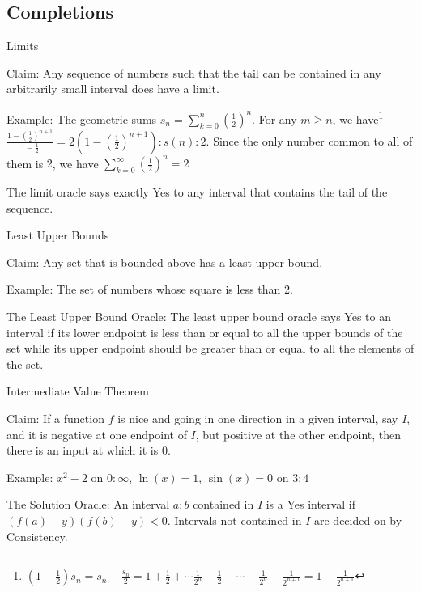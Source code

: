 \documentclass{beamer}
\begin{document}
\subsection{Completions}

\begin{frame}{Limits}

Claim: Any sequence of numbers such that the tail can be contained in any arbitrarily small interval does have a limit. 

Example: The geometric sums $s_n = \sum_{k=0}^n (\frac{1}{2})^n$. For any $m \geq n$, we have\footnote{$(1-\frac{1}{2} ) s_n = s_n - \frac{s_n}{2} = 1 + \frac{1}{2} + \cdots \frac{1}{2^n} - \frac{1}{2} - \cdots -\frac{1}{2^n} - \frac{1}{2^{n+1} } = 1 - \frac{1}{2^{n+1}}$ } $\frac{1 - (\frac{1}{2})^{n+1}}{1 - \frac{1}{2}}= 2 (1 - (\frac{1}{2})^{n+1}):s(n):2$. Since the only number common to all of them is $2$, we have $\sum_{k=0}^{\infty} (\frac{1}{2})^n = 2$

The limit oracle says exactly Yes to any interval that contains the tail of the sequence. 


    
\end{frame}

\begin{frame}{Least Upper Bounds}

Claim:  Any set that is bounded above has a least upper bound. 

Example:  The set of numbers whose square is less than 2. 

The Least Upper Bound Oracle:  The least upper bound oracle says Yes to an interval if its lower endpoint is less than or equal to all the upper bounds of the set while its upper endpoint should be greater than or equal to all the elements of the set. 
    
\end{frame}

\begin{frame}{Intermediate Value Theorem}

Claim: If a function $f$ is nice and going in one direction in a given interval, say $I$, and it is negative at one endpoint of $I$, but positive at the other endpoint, then there is an input at which it is $0$.

Example: $x^2 -2$ on $0:\infty$,  $\ln(x) = 1$, $\sin(x) = 0$ on $3:4$

The Solution Oracle:  An interval $a:b$ contained in $I$ is a Yes interval if $( f(a) - y)(f(b) - y) < 0$. Intervals not contained in $I$ are decided on by Consistency. 
    
\end{frame}
\end{document}
